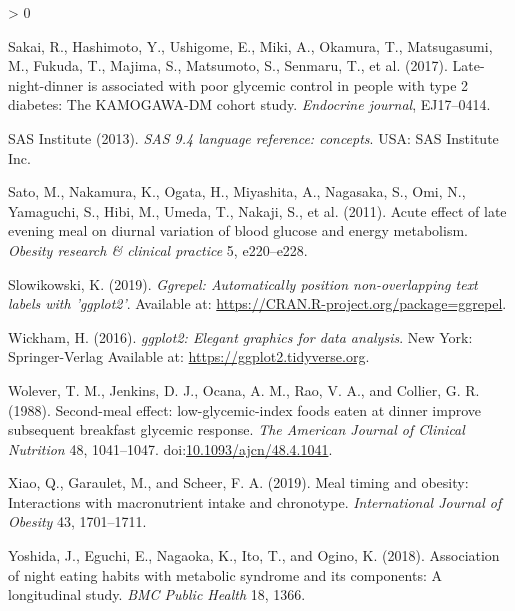 \documentclass[utf8]{frontiersSCNS}
\newlength{\cslhangindent}
\newenvironment{CSLReferences}[2] %
 {%
  \setlength{\parindent}{0pt}
  \ifodd #1 \everypar{\setlength{\hangindent}{\cslhangindent}}\ignorespaces\fi
  \ifnum #2 > 0
  \setlength{\parskip}{#2\baselineskip}
  \fi
 }%
 {}
\begin{document}
\begin{CSLReferences}{1}{0}
\leavevmode\hypertarget{ref-sakai2017late}{}%
Sakai, R., Hashimoto, Y., Ushigome, E., Miki, A., Okamura, T.,
Matsugasumi, M., Fukuda, T., Majima, S., Matsumoto, S., Senmaru, T., et
al. (2017). Late-night-dinner is associated with poor glycemic control
in people with type 2 diabetes: The KAMOGAWA-DM cohort study.
\emph{Endocrine journal}, EJ17--0414.

\leavevmode\hypertarget{ref-SAS94}{}%
SAS Institute (2013). \emph{SAS 9.4 language reference: concepts}. USA:
SAS Institute Inc.

\leavevmode\hypertarget{ref-sato2011acute}{}%
Sato, M., Nakamura, K., Ogata, H., Miyashita, A., Nagasaka, S., Omi, N.,
Yamaguchi, S., Hibi, M., Umeda, T., Nakaji, S., et al. (2011). Acute
effect of late evening meal on diurnal variation of blood glucose and
energy metabolism. \emph{Obesity research \& clinical practice} 5,
e220--e228.

\leavevmode\hypertarget{ref-ggrepel}{}%
Slowikowski, K. (2019). \emph{Ggrepel: Automatically position
non-overlapping text labels with 'ggplot2'}. Available at:
\url{https://CRAN.R-project.org/package=ggrepel}.

\leavevmode\hypertarget{ref-ggplot2}{}%
Wickham, H. (2016). \emph{ggplot2: Elegant graphics for data analysis}.
New York: Springer-Verlag Available at:
\url{https://ggplot2.tidyverse.org}.

\leavevmode\hypertarget{ref-Wolever1988}{}%
Wolever, T. M., Jenkins, D. J., Ocana, A. M., Rao, V. A., and Collier,
G. R. (1988). {Second-meal effect: low-glycemic-index foods eaten at
dinner improve subsequent breakfast glycemic response}. \emph{The
American Journal of Clinical Nutrition} 48, 1041--1047.
doi:\href{https://doi.org/10.1093/ajcn/48.4.1041}{10.1093/ajcn/48.4.1041}.

\leavevmode\hypertarget{ref-xiao2019meal}{}%
Xiao, Q., Garaulet, M., and Scheer, F. A. (2019). Meal timing and
obesity: Interactions with macronutrient intake and chronotype.
\emph{International Journal of Obesity} 43, 1701--1711.

\leavevmode\hypertarget{ref-yoshida2018association}{}%
Yoshida, J., Eguchi, E., Nagaoka, K., Ito, T., and Ogino, K. (2018).
Association of night eating habits with metabolic syndrome and its
components: A longitudinal study. \emph{BMC Public Health} 18, 1366.

\end{CSLReferences}
\end{document}

